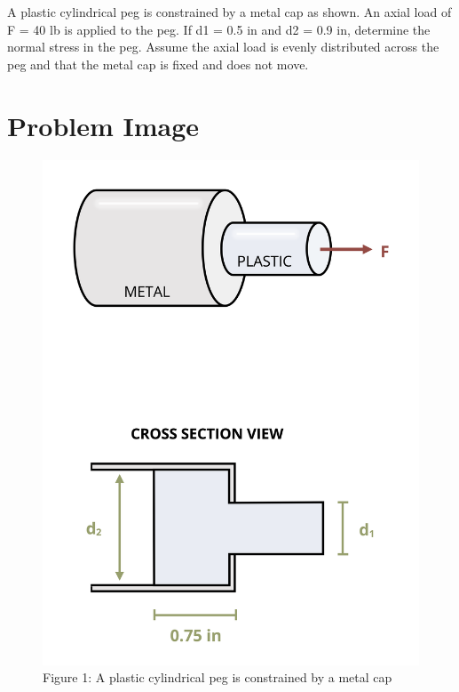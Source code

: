 \documentclass[
  letterpaper,
  DIV=11,
  numbers=noendperiod]{scrreprt}
\begin{document}

A plastic cylindrical peg is constrained by a metal cap as shown. An
axial load of F = 40 lb is applied to the peg. If d1 = 0.5 in and d2 =
0.9 in, determine the normal stress in the peg. Assume the axial load is
evenly distributed across the peg and that the metal cap is fixed and
does not move.

\section*{Problem Image}\label{problem-image-12}


\begin{figure}[H]

{\centering \includegraphics{images/144.png}

}

\caption{Figure 1: A plastic cylindrical peg is constrained by a metal
cap}

\end{figure}%
\end{document}

